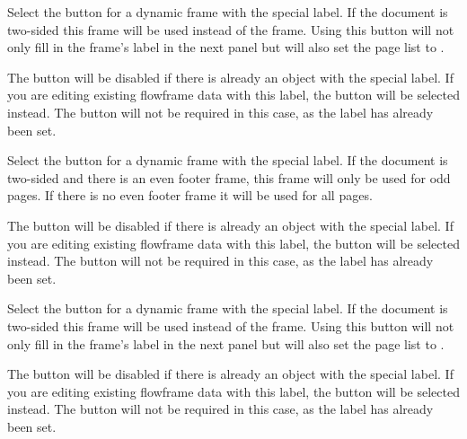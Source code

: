 Select the  button for a dynamic frame
with the special  label. 
If the document is two-sided this frame will be used instead of the
 frame. Using this button will not only fill in the
frame's label in the next panel but will also set the page list to
.

The  button will be disabled if
there is already an object with the special  label.
If you are editing existing \gls{flowframe} data with this label, the 
 button will be selected
instead. The  button will not be
required in this case, as the label has already been set.

Select the  button for a dynamic frame
with the special  label. If the
document is two-sided and there is an even footer frame, this frame
will only be used for odd pages. If there is no even footer frame it
will be used for all pages.

The  button will be disabled if
there is already an object with the special  label.
If you are editing existing \gls{flowframe} data with this label, the 
 button will be selected
instead. The  button will not be
required in this case, as the label has already been set.

Select the  button for a dynamic frame
with the special  label. If
the document is two-sided this frame will be used instead of the
 frame. Using this button will not only fill
in the frame's label in the next panel but will also set the page
list to .

The  button will be disabled if
there is already an object with the special  label.
If you are editing existing \gls{flowframe} data with this label, the 
 button will be selected
instead. The  button will not be
required in this case, as the label has already been set.

